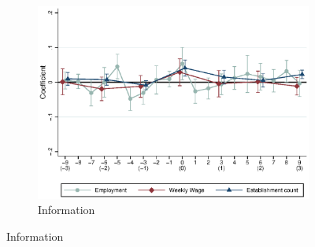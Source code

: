 \documentclass{article}
\begin{document}
\begin{figure}
\begin{subfigure}[b]{.48\textwidth}
		\centering
		\includegraphics[width = \textwidth]{../../analysis/first_differences_controls/output/fd_models_info_w3.eps}
		\caption{Information}
	\end{subfigure}
\end{figure}
\end{document}
